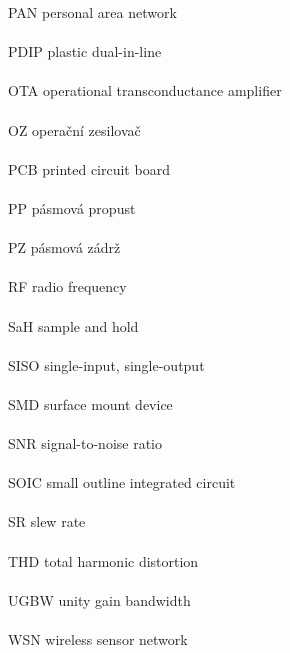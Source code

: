 PAN \hfill personal area network \\ \\
PDIP \hfill plastic dual-in-line \\ \\
OTA \hfill operational transconductance amplifier \\ \\
OZ \hfill operační zesilovač \\ \\
PCB \hfill printed circuit board \\ \\
PP \hfill pásmová propust \\ \\
PZ \hfill pásmová zádrž \\ \\
RF \hfill radio frequency \\ \\
SaH \hfill sample and hold \\ \\
SISO \hfill single-input, single-output \\ \\
SMD \hfill surface mount device \\ \\
SNR \hfill signal-to-noise ratio \\ \\
SOIC \hfill small outline integrated circuit \\ \\
SR \hfill slew rate \\ \\
THD \hfill total harmonic distortion \\ \\
UGBW \hfill unity gain bandwidth \\ \\
WSN \hfill wireless sensor network \\ \\